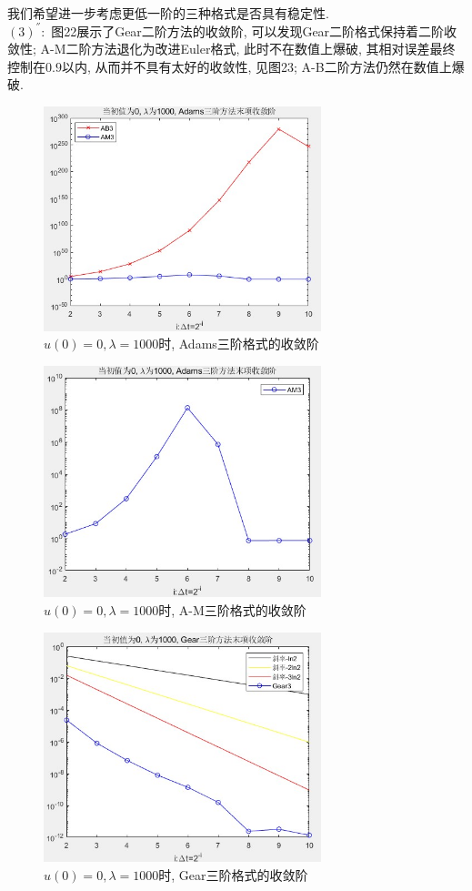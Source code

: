 \documentclass[12pt]{article}
\begin{document}
\quad \\
我们希望进一步考虑更低一阶的三种格式是否具有稳定性.\\
$(3)^{''}:$ 图22展示了Gear二阶方法的收敛阶, 可以发现Gear二阶格式保持着二阶收敛性; A-M二阶方法退化为改进Euler格式, 此时不在数值上爆破, 其相对误差最终控制在$0.9$以内, 从而并不具有太好的收敛性, 见图23; A-B二阶方法仍然在数值上爆破. 
\begin{figure}[H]
	\centering
	\includegraphics[width=0.72\textwidth]{19}
	\caption{$u(0)=0, \lambda=1000$时, Adams三阶格式的收敛阶}
\end{figure}
\begin{figure}[H]
	\centering
	\includegraphics[width=0.72\textwidth]{20}
	\caption{$u(0)=0, \lambda=1000$时, A-M三阶格式的收敛阶}
\end{figure}
\begin{figure}[H]
	\centering
	\includegraphics[width=0.72\textwidth]{21}
	\caption{$u(0)=0, \lambda=1000$时, Gear三阶格式的收敛阶}
\end{figure}
\end{document}
